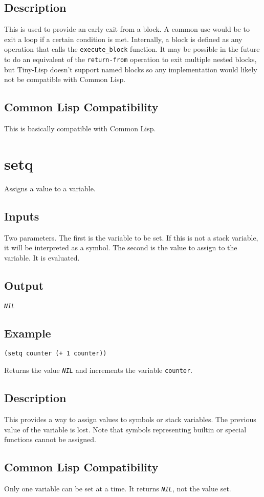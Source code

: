 \documentclass[10pt, openany]{book}
\newcommand{\function}[1]{\texttt{#1}}
\newcommand{\constant}[1]{\emph{\texttt{#1}}}
\newcommand{\keyword}[1]{\texttt{#1}}
\newcommand{\tl}{Tiny-Lisp}
\newcommand{\cl}{Common Lisp}
\begin{document}
\subsection{Description}
This is used to provide an early exit from a block.  A common use would be to exit a loop if a certain condition is met.  Internally, a block is defined as any operation that calls the \function{execute\_block} function.  It may be possible in the future to do an equivalent of the \keyword{return-from} operation to exit multiple nested blocks, but \tl{} doesn't support named blocks so any implementation would likely not be compatible with \cl.
\subsection{Common Lisp Compatibility}
This is basically compatible with \cl.

\section{setq}
Assigns a value to a variable.
\subsection{Inputs}
Two parameters.  The first is the variable to be set.  If this is not a stack variable, it will be interpreted as a symbol.  The second is the value to assign to the variable.  It is evaluated.
\subsection{Output}
\constant{NIL}
\subsection{Example}
\begin{lstlisting}
(setq counter (+ 1 counter))
\end{lstlisting}
Returns the value \constant{NIL} and increments the variable \keyword{counter}.
\subsection{Description}
This provides a way to assign values to symbols or stack variables.  The previous value of the variable is lost.  Note that symbols representing builtin or special functions cannot be assigned.
\subsection{Common Lisp Compatibility}
Only one variable can be set at a time.  It returns \constant{NIL}, not the value set.
\end{document}
